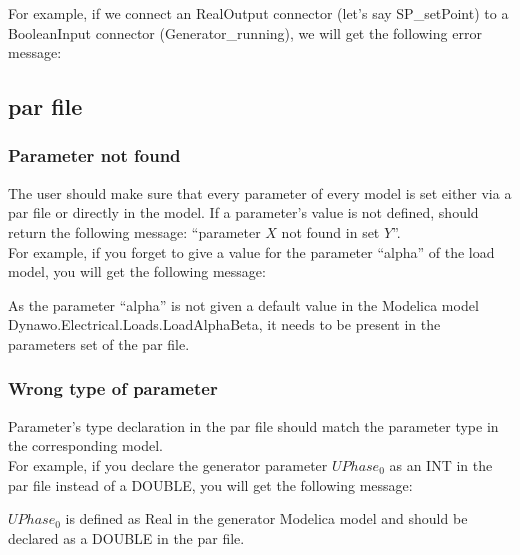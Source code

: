 \documentclass[a4paper, 12pt]{report}
\begin{document}
For example, if we connect an RealOutput connector (let's say SP\_setPoint) to a BooleanInput connector (Generator\_running), we will get the following error message:



\subsection{par file}

\subsubsection{Parameter not found}

The user should make sure that every parameter of every model is set either via a par file or directly in the model. If a parameter's value is not defined, \Dynawo should return the following message: ``parameter $X$ not found in set $Y$''. \\

For example, if you forget to give a value for the parameter ``alpha'' of the load model, you will get the following message:


As the parameter ``alpha'' is not given a default value in the Modelica model Dynawo.Electrical.Loads.LoadAlphaBeta, it needs to be present in the parameters set of the par file.

\subsubsection{Wrong type of parameter}

Parameter's type declaration in the par file should match the parameter type in the corresponding model. \\

For example, if you declare the generator parameter $UPhase_0$ as an INT in the par file instead of a DOUBLE, you will get the following message:
\vspace{0.6cm} %


$UPhase_0$ is defined as Real in the generator Modelica model and should be declared as a DOUBLE in the par file.
\end{document}
